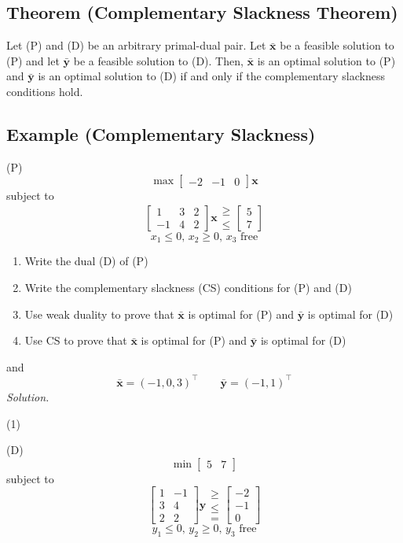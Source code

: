 \begin{thmbox}
    \subsection{Theorem (Complementary Slackness Theorem)}
    Let (P) and (D) be an arbitrary primal-dual pair. Let
    $ \bm{\bar{x}} $ be a feasible solution to (P) and let
    $ \bm{\bar{y}} $ be a feasible solution to (D). Then,
    $ \bm{\bar{x}} $ is an optimal solution to (P) and
    $ \bm{\bar{y}} $ is an optimal solution to (D) if and only if
    the complementary slackness conditions hold.
\end{thmbox}

\subsection{Example (Complementary Slackness)}
(P)
\[ \max
\begin{bmatrix}
    -2 & -1 & 0
\end{bmatrix}\bm{x} \]
subject to
\[
\begin{bmatrix}
    1 & 3 & 2\\
    -1 & 4 & 2
\end{bmatrix}\bm{x}
\begin{matrix}
    \ge\\
    \le
\end{matrix}
\begin{bmatrix}
    5\\
    7
\end{bmatrix}\]
\[ x_1\le 0,\,x_2\ge 0,\,x_3\text{ free} \]
\begin{enumerate}[(1)]
    \item Write the dual (D) of (P)
    \item Write the complementary slackness (CS) conditions for (P) and (D)
    \item Use weak duality to prove that $ \bm{\bar{x}} $ is optimal for (P)
    and $ \bm{\bar{y}} $ is optimal for (D)
    \item Use CS to prove that $ \bm{\bar{x}} $ is optimal for (P) and
    $ \bm{\bar{y}} $ is optimal for (D)
\end{enumerate}
and
\[ \bm{\bar{x}}=(-1,0,3)^\top\qquad \bm{\bar{y}}=(-1,1)^\top \]
\emph{Solution.}

(1)

(D)
\[ \min
\begin{bmatrix}
    5 & 7
\end{bmatrix} \]
subject to
\[
\begin{bmatrix}
    1 & -1\\
    3 & 4\\
    2 & 2
\end{bmatrix}\bm{y}
\begin{matrix}
    \ge\\
    \le\\
    =
\end{matrix}
\begin{bmatrix}
    -2\\
    -1\\
    0
\end{bmatrix}\]
\[ y_1\le 0,\,y_2\ge 0,\,y_3\text{ free} \]

